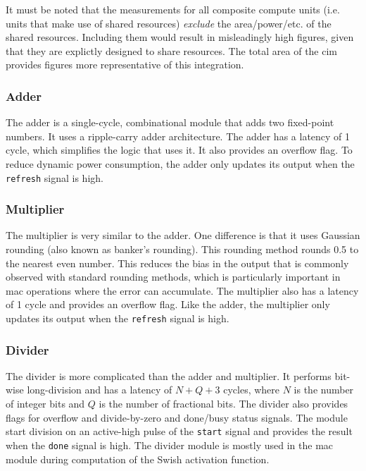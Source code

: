 It must be noted that the measurements for all composite compute units (i.e. units that make use of shared resources) \textit{exclude} the area/power/etc. of the shared resources.
Including them would result in misleadingly high figures, given that they are explictly designed to share resources. The total area of the \ac{cim} provides figures more representative
of this integration.

\subsubsection{Adder}
The adder is a single-cycle, combinational module that adds two fixed-point numbers. It uses a ripple-carry adder architecture. The adder has a latency of 1 cycle, which simplifies the logic that uses it.
It also provides an overflow flag. To reduce dynamic power consumption, the adder only updates its output when the \texttt{refresh} signal is high.

\subsubsection{Multiplier}
The multiplier is very similar to the adder. One difference is that it uses Gaussian rounding (also known as banker's rounding). This rounding method rounds 0.5 to the nearest even number. This reduces
the bias in the output that is commonly observed with standard rounding methods, which is particularly important in \ac{mac} operations where the error can accumulate. The multiplier also has a latency of 1
cycle and provides an overflow flag. Like the adder, the multiplier only updates its output when the \texttt{refresh} signal is high.

\subsubsection{Divider}
The divider is more complicated than the adder and multiplier. It performs bit-wise long-division and has a latency of $N+Q+3$ cycles, where $N$ is the number of integer bits and $Q$ is the number of fractional
bits. The divider also provides flags for overflow and divide-by-zero and done/busy status signals. The module start division on an active-high pulse of the \texttt{start} signal and provides the result when the
\texttt{done} signal is high. The divider module is mostly used in the \ac{mac} module during computation of the Swish activation function.

